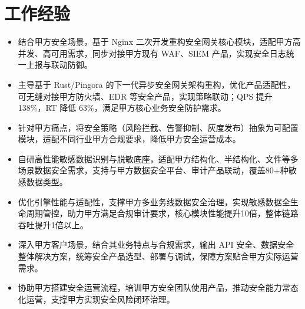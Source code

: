 \vspace{0.10cm}

\section{工作经验}
\vspace{0.10cm}


\begin{itemize}
    \item 结合甲方安全场景，基于 Nginx 二次开发重构安全网关核心模块，适配甲方高并发、高可用需求，同步对接甲方现有 WAF、SIEM 产品，实现安全日志统一上报与联动防御。
    \item 主导基于 Rust/Pingora 的下一代异步安全网关架构重构，优化产品适配性，可无缝对接甲方防火墙、EDR 等安全产品，实现策略联动；QPS 提升 138\%，RT 降低 63\%，满足甲方核心业务安全防护需求。
    \item 针对甲方痛点，将安全策略（风险拦截、告警抑制、灰度发布）抽象为可配置模块，适配不同行业甲方合规要求，降低甲方安全运营成本。
\end{itemize}

\begin{itemize}
    \item 自研高性能敏感数据识别与脱敏底座，适配甲方结构化、半结构化、文件等多场景数据安全需求，支持与甲方数据安全平台、审计产品联动，覆盖80+种敏感数据类型。
    \item 优化引擎性能与适配性，支撑甲方多业务线数据安全治理，实现敏感数据全生命周期管控，助力甲方满足合规审计要求，核心模块性能提升10倍，整体链路吞吐提升1倍以上。
\end{itemize}

\begin{itemize}
    \item 深入甲方客户场景，结合其业务特点与合规需求，输出 API 安全、数据安全整体解决方案，统筹安全产品选型、部署与调试，保障方案贴合甲方实际运营需求。
    \item 协助甲方搭建安全运营流程，培训甲方安全团队使用产品，推动安全能力常态化运营，支撑甲方实现安全风险闭环治理。
\end{itemize}

\vspace{0.10cm}


